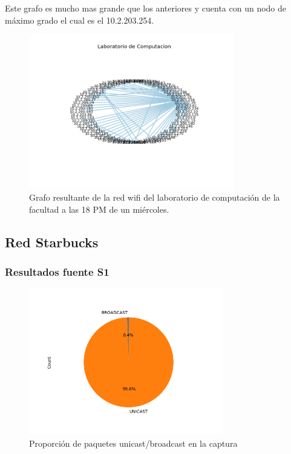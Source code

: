 Este grafo es mucho mas grande que los anteriores y cuenta con un nodo de máximo grado el cual es el 10.2.203.254.

\begin{figure}[H]
 \centering
	\includegraphics[width=0.8\textwidth]{figs/dc.png}
	\caption{Grafo resultante de la red wifi del laboratorio de computación de la facultad a las 18 PM de un miércoles.}
	\label{fig:dc-grafo}
\end{figure}

\subsection*{Red Starbucks}
\subsubsection*{Resultados fuente S1}
\begin{figure}[H]
  \centering
  \includegraphics[width=8.5cm]{figs/broadcast_proportion_starbucks_S1_output.png}
  \caption{\normalfont Proporción de paquetes unicast/broadcast en la captura}
\end{figure}

